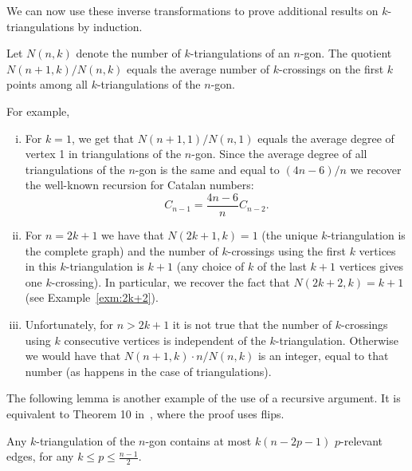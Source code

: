 \documentclass[12pt]{amsart}
\begin{document}
We can now use these inverse transformations to prove additional results on $k$-triangulations by induction. 

\begin{corollary}\label{enumerationinduction}
Let $N(n,k)$ denote the number of $k$-triangulations of an $n$-gon. The quotient $N(n+1,k)/N(n,k)$ equals the average number of $k$-crossings on the first $k$ points among all $k$-triangulations of the $n$-gon.
\end{corollary}

For example,
\begin{enumerate}[(i)]
\item For $k=1$, we get that $N(n+1,1)/N(n,1)$ equals the average degree of vertex 1 in triangulations of the $n$-gon. Since the average degree of all triangulations of the $n$-gon is the same and equal to $(4n-6)/n$ we recover the well-known recursion for Catalan numbers:
$$C_{n-1}=\frac{4n-6}{n}C_{n-2}.$$

\item For $n=2k+1$ we have that $N(2k+1,k)=1$ (the unique $k$-triangulation is the complete graph)
and the number of $k$-crossings using the first $k$ vertices in this $k$-triangulation is $k+1$ (any choice of $k$ of the last $k+1$ vertices gives one $k$-crossing). In particular, we recover the fact that $N(2k+2,k)=k+1$ (see Example~\ref{exm:2k+2}).

\item Unfortunately, for $n>2k+1$ it is not true that the number of $k$-crossings using $k$ consecutive vertices is independent of the $k$-triangulation. Otherwise we would have that $N(n+1,k)\cdot n /N(n,k)$ is an integer, equal to that number (as happens in the case of triangulations).
\end{enumerate}

\medskip
The following lemma is another example of the use of a recursive argument. It is equivalent to Theorem 10 in~\cite{n-gdfcp-00}, where the proof uses flips.

\begin{lemma}
Any $k$-triangulation of the $n$-gon contains at most $k(n-2p-1)$ $p$-relevant edges, for any $k\le p\le \frac{n-1}{2}$.
\end{lemma}
\end{document}
